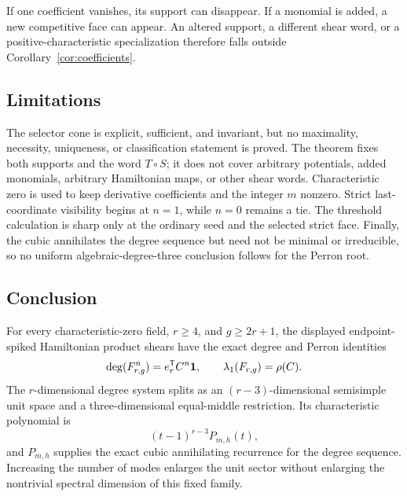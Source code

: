 \documentclass[11pt]{article}
\theoremstyle{remark}
\numberwithin{equation}{section}
\begin{document}
If one coefficient vanishes, its support can disappear.  If a monomial is
added, a new competitive face can appear.  An altered support, a different
shear word, or a positive-characteristic specialization therefore falls
outside Corollary~\ref{cor:coefficients}.

\subsection{Limitations}

The selector cone is explicit, sufficient, and invariant, but no maximality,
necessity, uniqueness, or classification statement is proved.  The theorem
fixes both supports and the word \(T\circ S\); it does not cover arbitrary
potentials, added monomials, arbitrary Hamiltonian maps, or other shear
words.  Characteristic zero is used to keep derivative coefficients and the
integer \(m\) nonzero.  Strict last-coordinate visibility begins at
\(n=1\), while \(n=0\) remains a tie.  The threshold calculation is sharp
only at the ordinary seed and the selected strict face.  Finally, the cubic
annihilates the degree sequence but need not be minimal or irreducible, so no
uniform algebraic-degree-three conclusion follows for the Perron root.

\subsection{Conclusion}

For every characteristic-zero field, \(r\geq4\), and \(g\geq2r+1\), the
displayed endpoint-spiked Hamiltonian product shears have the exact degree
and Perron identities
\[
\operatorname{deg}(F_{r,g}^n)=e_r^{\mathsf{T}}C^n\mathbf{1},
\qquad
\lambda_1(F_{r,g})=\rho(C).
\]
The \(r\)-dimensional degree system splits as an
\((r-3)\)-dimensional semisimple unit space and a three-dimensional
equal-middle restriction.  Its characteristic polynomial is
\[
(t-1)^{r-3}P_{m,h}(t),
\]
and \(P_{m,h}\) supplies the exact cubic annihilating recurrence for the
degree sequence.  Increasing the number of modes enlarges the unit sector
without enlarging the nontrivial spectral dimension of this fixed family.



\end{document}
